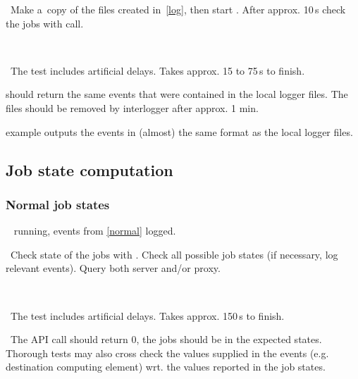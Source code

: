 \what\ Make a~copy of the files created in~\ref{log}, then start
. After approx. 10\,s check the jobs
with  call.

\how\ 

\note\ The test includes artificial delays. Takes approx. 15 to 75\,s to finish.

\result {} should return the same events that were
contained in the local logger files. The files should be removed by
interlogger after approx. 1 min.

\begin{hints}
 example outputs the events in (almost) the same
format as the local logger files.
\end{hints}




\subsection{Job state computation}

\subsubsection{Normal job states}
\label{state}

\req\  running, events from \ref{normal} logged.

\what\ Check state of the jobs with . Check all possible job states 
(if necessary, log relevant events). Query both server and/or proxy.

\how\ 

\note\ The test includes artificial delays. Takes approx. 150\,s to finish.

\result\ The API call should return 0, the jobs should be in the expected
states. Thorough tests may also cross check the values supplied in the
events (e.g. destination computing element) wrt. the values reported in the job states.







